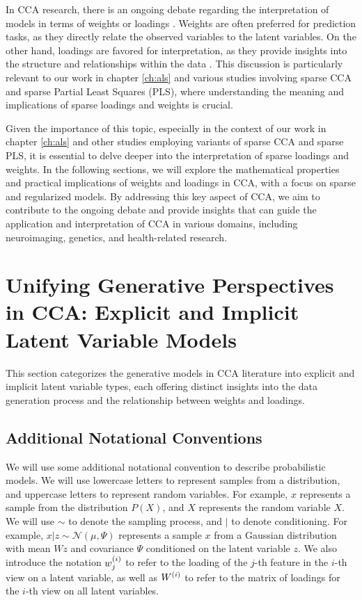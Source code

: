 In CCA research, there is an ongoing debate regarding the interpretation of models in terms of weights or loadings \citep{gu2018simultaneous}. Weights are often preferred for prediction tasks, as they directly relate the observed variables to the latent variables. On the other hand, loadings are favored for interpretation, as they provide insights into the structure and relationships within the data \citep{liu2022improved}. This discussion is particularly relevant to our work in chapter \ref{ch:als} and various studies involving sparse CCA and sparse Partial Least Squares (PLS), where understanding the meaning and implications of sparse loadings and weights is crucial.

Given the importance of this topic, especially in the context of our work in chapter \ref{ch:als} and other studies employing variants of sparse CCA and sparse PLS, it is essential to delve deeper into the interpretation of sparse loadings and weights. In the following sections, we will explore the mathematical properties and practical implications of weights and loadings in CCA, with a focus on sparse and regularized models. By addressing this key aspect of CCA, we aim to contribute to the ongoing debate and provide insights that can guide the application and interpretation of CCA in various domains, including neuroimaging, genetics, and health-related research.

\section{Unifying Generative Perspectives in CCA: Explicit and Implicit Latent Variable Models}

This section categorizes the generative models in CCA literature into explicit and implicit latent variable types, each offering distinct insights into the data generation process and the relationship between weights and loadings.

\subsection{Additional Notational Conventions}

We will use some additional notational convention to describe probabilistic models.
We will use lowercase letters to represent samples from a distribution, and uppercase letters to represent random variables.
For example, \(x\) represents a sample from the distribution \(P(X)\), and \(X\) represents the random variable \(X\).
We will use $\sim$ to denote the sampling process, and $|$ to denote conditioning.
For example, \(x | z \sim \mathcal{N}(\mu, \Psi)\) represents a sample \(x\) from a Gaussian distribution with mean \(Wz\) and covariance \(\Psi\) conditioned on the latent variable \(z\).
We also introduce the notation \(w^{(i)}_{j}\) to refer to the loading of the \(j\)-th feature in the \(i\)-th view on a latent variable, as well as \(W^{(i)}\) to refer to the matrix of loadings for the \(i\)-th view on all latent variables.


